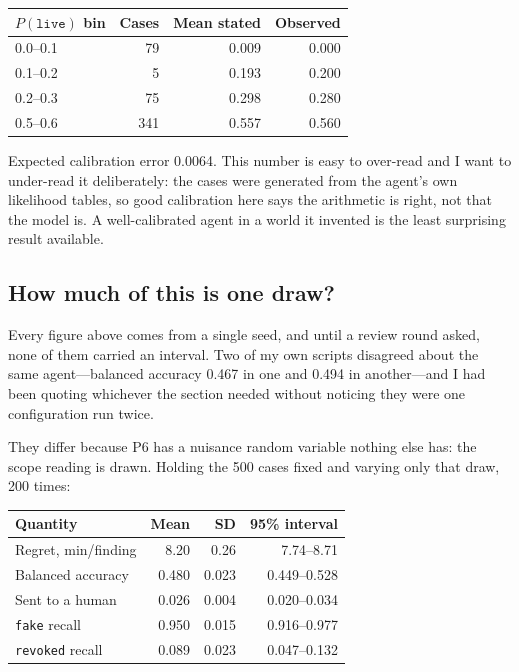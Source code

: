\documentclass{article}
\begin{document}
\begin{center}
\small
\begin{tabular}{@{}lrrr@{}}
\toprule
$P(\texttt{live})$ bin & Cases & Mean stated & Observed \\
\midrule
0.0--0.1 & 79 & 0.009 & 0.000 \\
0.1--0.2 & 5 & 0.193 & 0.200 \\
0.2--0.3 & 75 & 0.298 & 0.280 \\
0.5--0.6 & 341 & 0.557 & 0.560 \\
\bottomrule
\end{tabular}
\end{center}

Expected calibration error 0.0064. This number is easy to over-read and I want to
under-read it deliberately: the cases were generated from the agent's own
likelihood tables, so good calibration here says the arithmetic is right, not
that the model is. A well-calibrated agent in a world it invented is the least
surprising result available.

\subsection{How much of this is one draw?}

Every figure above comes from a single seed, and until a review round asked, none
of them carried an interval. Two of my own scripts disagreed about the same
agent---balanced accuracy 0.467 in one and 0.494 in another---and I had been
quoting whichever the section needed without noticing they were one
configuration run twice.

They differ because P6 has a nuisance random variable nothing else has: the scope
reading is drawn. Holding the 500 cases fixed and varying only that draw, 200
times:

\begin{center}
\small
\begin{tabular}{@{}lrrr@{}}
\toprule
Quantity & Mean & SD & 95\% interval \\
\midrule
Regret, min/finding & 8.20 & 0.26 & 7.74--8.71 \\
Balanced accuracy & 0.480 & 0.023 & 0.449--0.528 \\
Sent to a human & 0.026 & 0.004 & 0.020--0.034 \\
\texttt{fake} recall & 0.950 & 0.015 & 0.916--0.977 \\
\texttt{revoked} recall & 0.089 & 0.023 & 0.047--0.132 \\
\bottomrule
\end{tabular}
\end{center}
\end{document}
